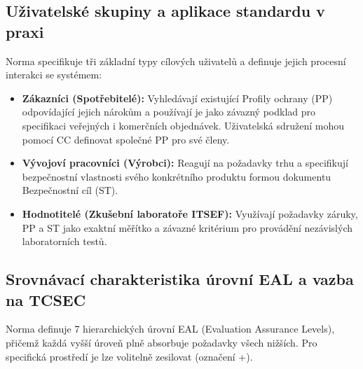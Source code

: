 \documentclass[10pt,a4paper]{article}
\begin{document}
	\subsection{Uživatelské skupiny a aplikace standardu v praxi}
	Norma specifikuje tři základní typy cílových uživatelů a definuje jejich procesní interakci se systémem:
	\begin{itemize}
		\item \textbf{Zákazníci (Spotřebitelé):} Vyhledávají existující Profily ochrany (PP) odpovídající jejich nárokům a používají je jako závazný podklad pro specifikaci veřejných i komerčních objednávek. Uživatelská sdružení mohou pomocí CC definovat společné PP pro své členy.
		
		\item \textbf{Vývojoví pracovníci (Výrobci):} Reagují na požadavky trhu a specifikují bezpečnostní vlastnosti svého konkrétního produktu formou dokumentu Bezpečnostní cíl (ST).
		
		\item \textbf{Hodnotitelé (Zkušební laboratoře ITSEF):} Využívají požadavky záruky, PP a ST jako exaktní měřítko a závazné kritérium pro provádění nezávislých laboratorních testů.
	\end{itemize}
		
	\subsection{Srovnávací charakteristika úrovní EAL a vazba na TCSEC}
	Norma definuje 7 hierarchických úrovní EAL (Evaluation Assurance Levels), přičemž každá vyšší úroveň plně absorbuje požadavky všech nižších. 
	Pro specifická prostředí je lze volitelně zesilovat (označení +). 
\end{document}
